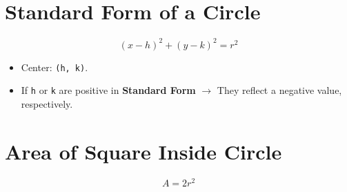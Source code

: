 \documentclass{article}
\begin{document}
\section{Standard Form of a Circle}
\[
  (x - h)^2 + (y - k)^2 = r^2
\]

\begin{itemize}
  \item Center: \texttt{(h, k)}. 
  \item If \texttt{h} or \texttt{k} are positive in \textbf{Standard Form} 
  $\rightarrow$ They reflect a negative value, respectively.
\end{itemize}

\section{Area of Square Inside Circle}
\[
  A = 2r^2
\]
\end{document}

